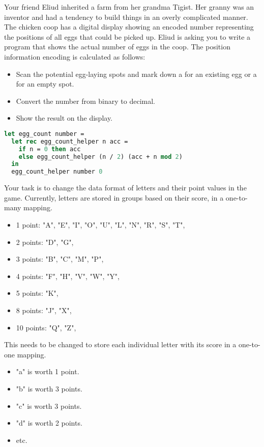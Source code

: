 Your friend Eliud inherited a farm from her grandma Tigist.
Her granny was an inventor and had a tendency to build things in an overly complicated manner.
The chicken coop has a digital display showing an encoded number representing the positions of all eggs that could be picked up.
Eliud is asking you to write a program that shows the actual number of eggs in the coop.
The position information encoding is calculated as follows:

\begin{itemize}
  \item Scan the potential egg-laying spots and mark down a  for an existing egg or a  for an empty spot.
  \item Convert the number from binary to decimal.
  \item Show the result on the display.
\end{itemize}

\begin{lstlisting}[language=OCaml]
let egg_count number =
  let rec egg_count_helper n acc =
    if n = 0 then acc
    else egg_count_helper (n / 2) (acc + n mod 2)
  in
  egg_count_helper number 0
\end{lstlisting}

Your task is to change the data format of letters and their point values in the game.
Currently, letters are stored in groups based on their score, in a one-to-many mapping.
\begin{itemize}
  \item 1 point: "A", "E", "I", "O", "U", "L", "N", "R", "S", "T",
  \item 2 points: "D", "G",
  \item 3 points: "B", "C", "M", "P",
  \item 4 points: "F", "H", "V", "W", "Y",
  \item 5 points: "K",
  \item 8 points: "J", "X",
  \item 10 points: "Q", "Z",
\end{itemize}
This needs to be changed to store each individual letter with its score in a one-to-one mapping.
\begin{itemize}
  \item "a" is worth 1 point.
  \item "b" is worth 3 points.
  \item "c" is worth 3 points.
  \item "d" is worth 2 points.
  \item etc.
\end{itemize}

